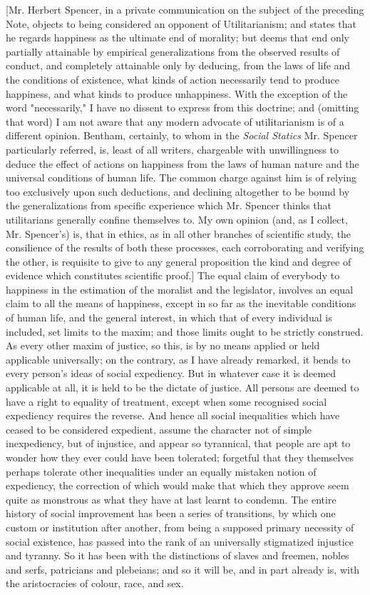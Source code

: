 \documentclass[12pt]{report}
\begin{document}
{[Mr. Herbert Spencer, in a private communication on the subject of the preceding Note, objects to being considered an opponent of Utilitarianism; and states that he regards happiness as the ultimate end of morality; but deems that end only partially attainable by empirical generalizations from the observed results of conduct, and completely attainable only by deducing, from the laws of life and the conditions of existence, what kinds of action necessarily tend to produce happiness, and what kinds to produce unhappiness. With the exception of the word "necessarily," I have no dissent to express from this doctrine; and (omitting that word) I am not aware that any modern advocate of utilitarianism is of a different opinion. Bentham, certainly, to whom in the \emph{Social Statics} Mr. Spencer particularly referred, is, least of all writers, chargeable with unwillingness to deduce the effect of actions on happiness from the laws of human nature and the universal conditions of human life. The common charge against him is of relying too exclusively upon such deductions, and declining altogether to be bound by the generalizations from specific experience which Mr. Spencer thinks that utilitarians generally confine themselves to. My own opinion (and, as I collect, Mr. Spencer's) is, that in ethics, as in all other branches of scientific study, the consilience of the results of both these processes, each corroborating and verifying the other, is requisite to give to any general proposition the kind and degree of evidence which constitutes scientific proof.]} The equal claim of everybody to happiness in the estimation of the moralist and the legislator, involves an equal claim to all the means of happiness, except in so far as the inevitable conditions of human life, and the general interest, in which that of every individual is included, set limits to the maxim; and those limits ought to be strictly construed. As every other maxim of justice, so this, is by no means applied or held applicable universally; on the contrary, as I have already remarked, it bends to every person's ideas of social expediency. But in whatever case it is deemed applicable at all, it is held to be the dictate of justice. All persons are deemed to have a right to equality of treatment, except when some recognised social expediency requires the reverse. And hence all social inequalities which have ceased to be considered expedient, assume the character not of simple inexpediency, but of injustice, and appear so tyrannical, that people are apt to wonder how they ever could have been tolerated; forgetful that they themselves perhaps tolerate other inequalities under an equally mistaken notion of expediency, the correction of which would make that which they approve seem quite as monstrous as what they have at last learnt to condemn. The entire history of social improvement has been a series of transitions, by which one custom or institution after another, from being a supposed primary necessity of social existence, has passed into the rank of an universally stigmatized injustice and tyranny. So it has been with the distinctions of slaves and freemen, nobles and serfs, patricians and plebeians; and so it will be, and in part already is, with the aristocracies of colour, race, and sex.
\end{document}
